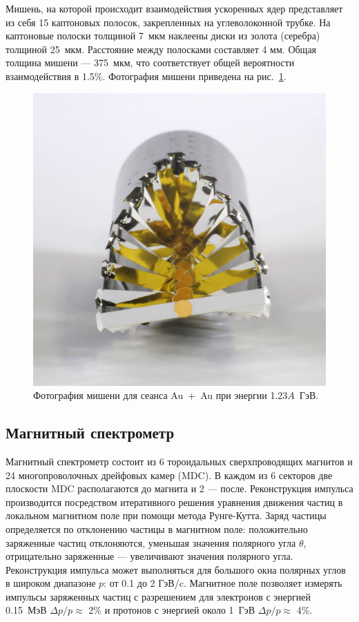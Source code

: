Мишень, на которой происходит взаимодействия ускоренных ядер представляет из себя 15 каптоновых полосок, закрепленных на углеволоконной трубке.
На каптоновые полоски толщиной 7~мкм наклеены диски из золота (серебра) толщиной 25~мкм.
Расстояние между полосками составляет 4 мм. 
Общая толщина мишени --- 375~мкм, что соответствует общей вероятности взаимодействия в 1.5\%.
Фотография мишени приведена на рис.~\ref{fig:hades_target}. 
%
\begin{figure}[ht]
\begin{center}
\includegraphics[width=0.55\linewidth]{images/hades_target.jpg}
\caption{ Фотография мишени для сеанса Au~+~Au при энергии 1.23$A$~ГэВ.  }
\label{fig:hades_target}
\end{center}
\end{figure}

\subsection{ Магнитный спектрометр }

Магнитный спектрометр состоит из 6 тороидальных сверхпроводящих магнитов и 24 многопроволочных дрейфовых камер (MDC).
В каждом из 6 секторов две плоскости MDC располагаются до магнита и 2 --- после. 
Реконструкция импульса производится посредством итеративного решения уравнения движения частиц в локальном магнитном поле при помощи метода Рунге-Кутта.
Заряд частицы определяется по отклонению частицы в магнитном поле: положительно заряженные частиц отклоняются, уменьшая значения полярного угла $\theta$, отрицательно заряженные --- увеличивают значения полярного угла.
Реконструкция импульса может выполняться для большого окна полярных углов в широком диапазоне $p$: от 0.1 до 2 ГэВ/c.
Магнитное поле позволяет измерять импульсы заряженных частиц с разрешением для электронов с энергией 0.15~МэВ $\Delta p/p \approx$ 2\% и протонов с энергией около 1~ГэВ $\Delta p/p \approx$ 4\%.  


